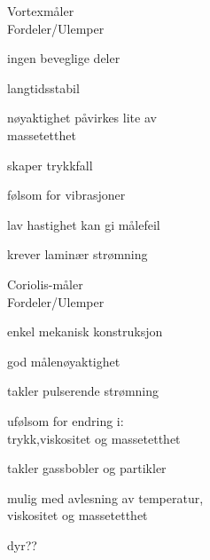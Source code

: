 \documentclass[avery5371,grid,frame]{flashcards}
\begin{document}
\begin{flashcard}{Vortexmåler\\Fordeler/Ulemper}
	\begin{multicols}{2}
		\begin{description}
			\item [Fordeler]
			\item ingen beveglige deler
			\item langtidsstabil
			\item nøyaktighet påvirkes lite av \\massetetthet
		\columnbreak
			\item [Ulemper]
			\item skaper trykkfall
			\item følsom for vibrasjoner
			\item lav hastighet kan gi målefeil
			\item krever laminær strømning
			\item 
		\end{description}
	\end{multicols}
\end{flashcard}


\begin{flashcard}{Coriolis-måler\\Fordeler/Ulemper}
	\begin{multicols}{2}
		\begin{description}
			\item [Fordeler]
			\item enkel mekanisk konstruksjon
			\item god målenøyaktighet
			\item takler pulserende strømning
			\item ufølsom for endring i:\\trykk,viskositet og massetetthet
			\item takler gassbobler og partikler
			\item mulig med avlesning av temperatur, \\ viskositet og massetetthet
		\columnbreak
			\item [Ulemper]
			\item dyr??
		\end{description}
	\end{multicols}
\end{flashcard}
\end{document}
